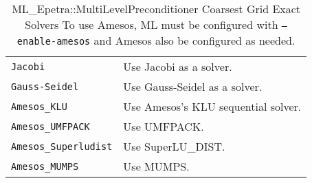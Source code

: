\begin{table}
\begin{center}
\begin{tabular}{ | p{5cm} | p{10cm} | }
\hline
\verb!Jacobi! & Use Jacobi as a solver. \\
\verb!Gauss-Seidel! & Use Gauss-Seidel as a solver. \\
\verb!Amesos_KLU! & Use Amesos's KLU sequential solver. \\
\verb!Amesos_UMFPACK! & Use UMFPACK. \\
\verb!Amesos_Superludist! & Use SuperLU\_DIST. \\
\verb!Amesos_MUMPS! & Use MUMPS. \\
\hline
\end{tabular}
\caption{ML\_Epetra::MultiLevelPreconditioner Coarsest Grid Exact Solvers
  To use Amesos, ML must be configured with {\tt --enable-amesos} 
  and Amesos also be configured as needed.}
\label{tab:ml:coarse}
\end{center}
\end{table}

